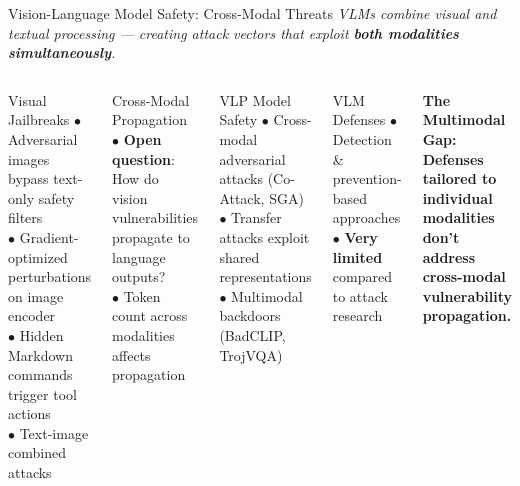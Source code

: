 \begin{frame}{Vision-Language Model Safety: Cross-Modal Threats}
  {\footnotesize\itshape VLMs combine visual and textual processing ---
    creating attack vectors that exploit \textbf{both modalities simultaneously}.}
  \vspace{0.3em}

  \begin{columns}[T]
    \begin{ucrcard}[UCRnavy]{Visual Jailbreaks}
      \scriptsize
      $\bullet$ Adversarial images bypass text-only safety filters\\
      $\bullet$ Gradient-optimized perturbations on image encoder\\
      $\bullet$ Hidden Markdown commands trigger tool actions\\
      $\bullet$ Text-image combined attacks
    \end{ucrcard}

    \vspace{0.3em}
    \begin{ucrcard}[UCRnavy]{Cross-Modal Propagation}
      \scriptsize
      $\bullet$ \textbf{Open question}: How do vision vulnerabilities propagate to language outputs?\\
      $\bullet$ Token count across modalities affects propagation
    \end{ucrcard}

    \begin{ucrcard}[UCRnavy]{VLP Model Safety}
      \scriptsize
      $\bullet$ Cross-modal adversarial attacks (Co-Attack, SGA)\\
      $\bullet$ Transfer attacks exploit shared representations\\
      $\bullet$ Multimodal backdoors (BadCLIP, TrojVQA)
    \end{ucrcard}

    \vspace{0.3em}
    \begin{ucrcard}[UCRnavy]{VLM Defenses}
      \scriptsize
      $\bullet$ Detection \& prevention-based approaches\\
      $\bullet$ \textbf{Very limited} compared to attack research
    \end{ucrcard}

    \vspace{0.2em}
    \begin{ucrinfo}
      \centering\scriptsize\bfseries The Multimodal Gap:\\[2pt]
      \normalfont\scriptsize
      Defenses tailored to individual modalities don't
      address cross-modal vulnerability propagation.
    \end{ucrinfo}
  \end{columns}
\end{frame}



